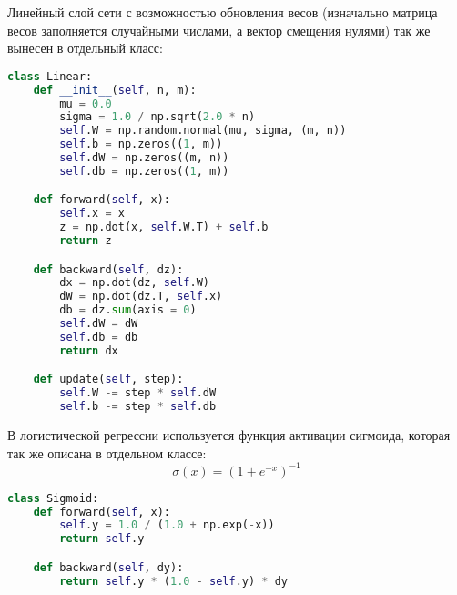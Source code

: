 Линейный слой сети с возможностью обновления весов (изначально матрица весов заполняется случайными числами, а вектор смещения нулями) так же вынесен в отдельный класс:
\begin{lstlisting}[language=Python]
class Linear:
    def __init__(self, n, m):
        mu = 0.0
        sigma = 1.0 / np.sqrt(2.0 * n)
        self.W = np.random.normal(mu, sigma, (m, n))
        self.b = np.zeros((1, m))
        self.dW = np.zeros((m, n))
        self.db = np.zeros((1, m))

    def forward(self, x):
        self.x = x
        z = np.dot(x, self.W.T) + self.b
        return z

    def backward(self, dz):
        dx = np.dot(dz, self.W)
        dW = np.dot(dz.T, self.x)
        db = dz.sum(axis = 0)
        self.dW = dW
        self.db = db
        return dx

    def update(self, step):
        self.W -= step * self.dW
        self.b -= step * self.db
\end{lstlisting}
В логистической регрессии используется функция активации сигмоида, которая так же описана в отдельном классе:
$$\sigma(x) = (1 + e ^ {-x}) ^ {-1}$$
\begin{lstlisting}[language=Python]
class Sigmoid:
    def forward(self, x):
        self.y = 1.0 / (1.0 + np.exp(-x))
        return self.y

    def backward(self, dy):
        return self.y * (1.0 - self.y) * dy
\end{lstlisting}
\pagebreak

